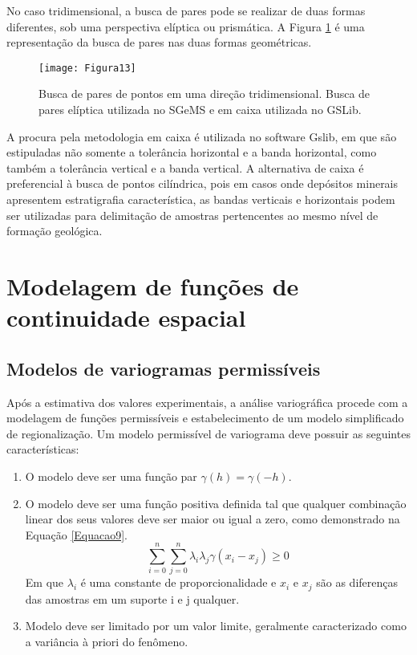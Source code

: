 No caso tridimensional, a busca de pares pode se realizar de duas formas diferentes, sob uma perspectiva elíptica ou prismática. A Figura \ref{Figura13} é uma representação da busca de pares nas duas formas geométricas. 


\begin{figure}[!]
	\centering
	\texttt{[image: Figura13]}
	\caption{Busca de pares de pontos em uma direção tridimensional. Busca de pares elíptica utilizada no SGeMS e em caixa utilizada no GSLib.}
	\label{Figura13}
\end{figure}

A procura pela metodologia em caixa é utilizada no software Gslib, em que são estipuladas não somente a tolerância horizontal e a banda horizontal, como também a tolerância vertical e a banda vertical. A alternativa de caixa é preferencial à busca de pontos cilíndrica, pois em casos onde depósitos minerais apresentem estratigrafia característica, as bandas verticais e horizontais podem ser utilizadas para delimitação de amostras pertencentes ao mesmo nível de formação geológica. 

\section{Modelagem de funções de continuidade espacial}

\subsection{Modelos de variogramas permissíveis}

Após a estimativa dos valores experimentais, a análise variográfica procede com a modelagem de funções permissíveis e estabelecimento de um modelo simplificado de regionalização. Um modelo permissível de variograma deve possuir as seguintes características: 

\begin{enumerate}
	\item 	O modelo  deve ser uma função par $\gamma(h)= \gamma(-h)$.
	\item O modelo deve ser uma função positiva definida tal que qualquer combinação linear dos seus valores deve ser maior ou igual a zero, como demonstrado na Equação \ref{Equacao9}.
	\begin{equation}\label{Equacao9}
	\sum_{i=0}^{n}\sum_{j=0}^{n}\lambda_i\lambda_j\gamma(x_i-x_j) \geq 0
	\end{equation}
	Em que $\lambda_i$ é uma constante de proporcionalidade e $x_i$ e $x_j$ são as diferenças das amostras em um suporte i e j qualquer.
	\item Modelo deve ser limitado por um valor limite, geralmente caracterizado como a variância à priori do fenômeno.
	
\end{enumerate}

